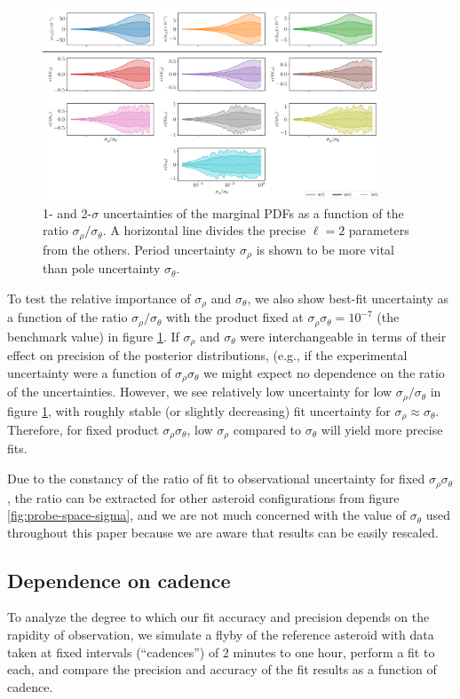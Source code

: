 \documentclass{aastex631}
\begin{document}
\begin{figure}
  \centering
  \includegraphics[width=0.9\textwidth]{sigma-ratios.pdf}
  \caption{1- and 2-$\sigma$ uncertainties of the marginal PDFs as a function of the ratio $\sigma_\rho / \sigma_\theta$. A horizontal line divides the precise $\ell=2$ parameters from the others. Period uncertainty $\sigma_\rho$ is shown to be more vital than pole uncertainty $\sigma_\theta$.}
  \label{fig:probe-sigma-ratio}
\end{figure}


To test the relative importance of $\sigma_\rho$ and $\sigma_\theta$, we also show best-fit uncertainty as a function of the ratio $\sigma_\rho / \sigma_\theta$ with the product fixed at $\sigma_\rho \sigma_\theta = 10^{-7}$ (the benchmark value) in figure \ref{fig:probe-sigma-ratio}. If $\sigma_\rho$ and $\sigma_\theta$ were interchangeable in terms of their effect on precision of the posterior distributions, (e.g., if the experimental uncertainty were a function of $\sigma_\rho \sigma_\theta$ we might expect no dependence on the ratio of the uncertainties. However, we see relatively low uncertainty for low $\sigma_\rho / \sigma_\theta$ in figure \ref{fig:probe-sigma-ratio}, with roughly stable (or slightly decreasing) fit uncertainty for $\sigma_\rho \approx \sigma_\theta$. Therefore, for fixed product $\sigma_\rho \sigma_\theta$, low $\sigma_\rho$ compared to $\sigma_\theta$ will yield more precise fits.

Due to the constancy of the ratio of fit to observational uncertainty for fixed $\sigma_\rho \sigma_\theta$, the ratio can be extracted for other asteroid configurations from figure \ref{fig:probe-space-sigma}, and we are not much concerned with the value of $\sigma_\theta$ used throughout this paper because we are aware that results can be easily rescaled.


\subsection{Dependence on cadence}
To analyze the degree to which our fit accuracy and precision depends on the rapidity of observation, we simulate a flyby of the reference asteroid with data taken at fixed intervals (``cadences'') of 2 minutes to one hour, perform a fit to each, and compare the precision and accuracy of the fit results as a function of cadence.
\end{document}

